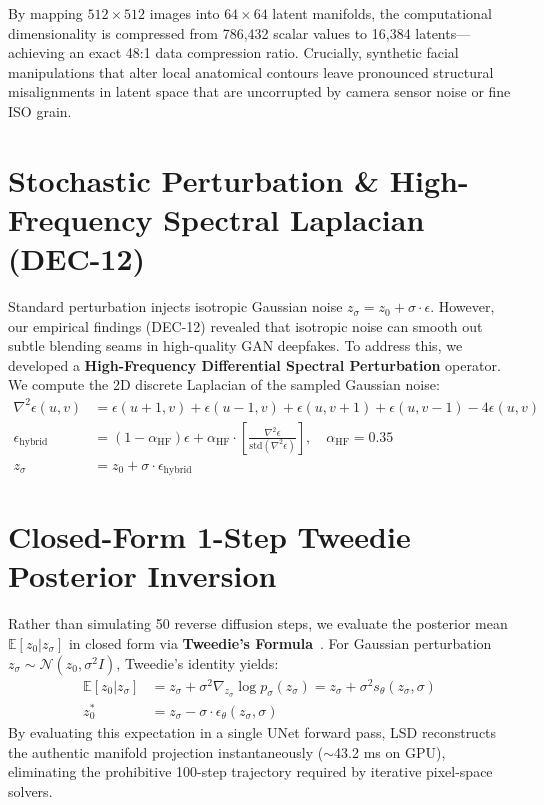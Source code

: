 \documentclass[12pt,a4paper]{report}
\begin{document}
By mapping $512 \times 512$ images into $64 \times 64$ latent manifolds, the computational dimensionality is compressed from 786,432 scalar values to 16,384 latents---achieving an exact 48:1 data compression ratio. Crucially, synthetic facial manipulations that alter local anatomical contours leave pronounced structural misalignments in latent space that are uncorrupted by camera sensor noise or fine ISO grain.

\section{Stochastic Perturbation \& High-Frequency Spectral Laplacian (DEC-12)}
Standard perturbation injects isotropic Gaussian noise $z_\sigma = z_0 + \sigma \cdot \epsilon$. However, our empirical findings (DEC-12) revealed that isotropic noise can smooth out subtle blending seams in high-quality GAN deepfakes. To address this, we developed a \textbf{High-Frequency Differential Spectral Perturbation} operator. We compute the 2D discrete Laplacian of the sampled Gaussian noise:
\begin{align}
    \nabla^2 \epsilon(u, v) &= \epsilon(u+1, v) + \epsilon(u-1, v) + \epsilon(u, v+1) + \epsilon(u, v-1) - 4\epsilon(u, v) \\
    \epsilon_{\text{hybrid}} &= (1 - \alpha_{\text{HF}})\epsilon + \alpha_{\text{HF}} \cdot \left[ \frac{\nabla^2 \epsilon}{\text{std}(\nabla^2 \epsilon)} \right], \quad \alpha_{\text{HF}} = 0.35 \\
    z_\sigma &= z_0 + \sigma \cdot \epsilon_{\text{hybrid}}
\end{align}

\section{Closed-Form 1-Step Tweedie Posterior Inversion}
Rather than simulating 50 reverse diffusion steps, we evaluate the posterior mean $\mathbb{E}[z_0 | z_\sigma]$ in closed form via \textbf{Tweedie's Formula}~\cite{efron2011tweedie}. For Gaussian perturbation $z_\sigma \sim \mathcal{N}(z_0, \sigma^2 I)$, Tweedie's identity yields:
\begin{align}
    \mathbb{E}[z_0 | z_\sigma] &= z_\sigma + \sigma^2 \nabla_{z_\sigma} \log p_\sigma(z_\sigma) = z_\sigma + \sigma^2 s_\theta(z_\sigma, \sigma) \\
    z^*_0 &= z_\sigma - \sigma \cdot \epsilon_\theta(z_\sigma, \sigma)
\end{align}
By evaluating this expectation in a single UNet forward pass, LSD reconstructs the authentic manifold projection instantaneously ($\sim$43.2 ms on GPU), eliminating the prohibitive 100-step trajectory required by iterative pixel-space solvers.
\end{document}

